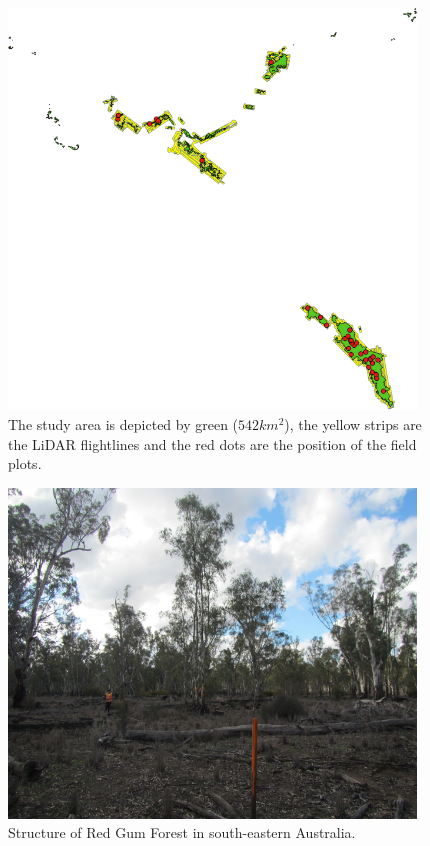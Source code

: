 \documentclass{subfiles}
\begin{document}
\begin{figure} [h!]
	\centering
	\begin{framed}
		\includegraphics[width=0.965\textwidth]{img/dead/StudyArea}
	\end{framed}
	\caption{The study area is depicted by green ($542km^2$), the yellow strips are the LiDAR flightlines and the red dots are the position of the field plots.}
	\label{fig:StudyArea}
\end{figure}

\begin{figure} [h!]
	\centering
	\includegraphics[width=0.965\textwidth]{img/dead/Eucalyptus.png}
	\caption{Structure of Red Gum Forest in south-eastern Australia.}
	\label{fig:EucalyptusSize}
\end{figure}
\end{document}
